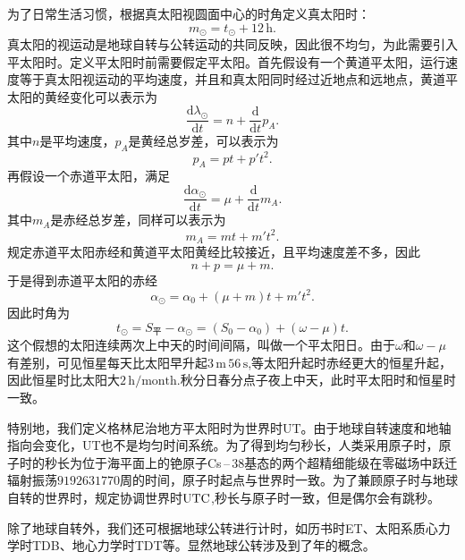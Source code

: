 \documentclass[11pt, a4paper, oneside]{ctexart}
\numberwithin{equation}{subsection}
\begin{document}
为了日常生活习惯，根据真太阳视圆面中心的时角定义真太阳时：
\begin{equation}
m_\odot=t_\odot+12\,\mathrm{h}.
\end{equation}
真太阳的视运动是地球自转与公转运动的共同反映，因此很不均匀，为此需要引入平太阳时。定义平太阳时前需要假定平太阳。首先假设有一个黄道平太阳，运行速度等于真太阳视运动的平均速度，并且和真太阳同时经过近地点和远地点，黄道平太阳的黄经变化可以表示为
\begin{equation}
\frac{\mathrm{d}\lambda_{\odot}}{\mathrm{d}t}=n+\frac{\mathrm{d}}{\mathrm{d}t}p_{A}.
\end{equation}
其中$n$是平均速度，$p_{A}$是黄经总岁差，可以表示为
\begin{equation}
p_{A}=pt+p't^{2}.
\end{equation}
再假设一个赤道平太阳，满足
\begin{equation}
\frac{\mathrm{d}\alpha_{\odot}}{\mathrm{d}t}=\mu+\frac{\mathrm{d}}{\mathrm{d}t}m_{A}.
\end{equation}
其中$m_{A}$是赤经总岁差，同样可以表示为
\begin{equation}
m_{A}=mt+m't^{2}.
\end{equation}
规定赤道平太阳赤经和黄道平太阳黄经比较接近，且平均速度差不多，因此
\begin{equation}
n+p=\mu+m.
\end{equation}
于是得到赤道平太阳的赤经
\begin{equation}
\alpha_{\odot}=\alpha_{0}+\left(\mu+m\right)t+m't^{2}.
\end{equation}
因此时角为
\begin{equation}
t_{\odot}=S_{\text{平}}-\alpha_{\odot}=\left(S_{0}-\alpha_{0}\right)+\left(\omega-\mu\right)t.
\end{equation}
这个假想的太阳连续两次上中天的时间间隔，叫做一个平太阳日。由于$\omega$和$\omega-\mu$有差别，可见恒星每天比太阳早升起$3\,\mathrm{m}\,56\,\mathrm{s}$,等太阳升起时赤经更大的恒星升起，因此恒星时比太阳大$2\,\mathrm{h/month}$.秋分日春分点子夜上中天，此时平太阳时和恒星时一致。

特别地，我们定义格林尼治地方平太阳时为世界时UT。由于地球自转速度和地轴指向会变化，UT也不是均匀时间系统。为了得到均匀秒长，人类采用原子时，原子时的秒长为位于海平面上的铯原子Cs\,--\,38基态的两个超精细能级在零磁场中跃迁辐射振荡$9192631770$周的时间，原子时起点与世界时一致。为了兼顾原子时与地球自转的世界时，规定协调世界时$\rm UTC$,秒长与原子时一致，但是偶尔会有跳秒。

除了地球自转外，我们还可根据地球公转进行计时，如历书时ET、太阳系质心力学时TDB、地心力学时TDT等。显然地球公转涉及到了年的概念。
\end{document}
